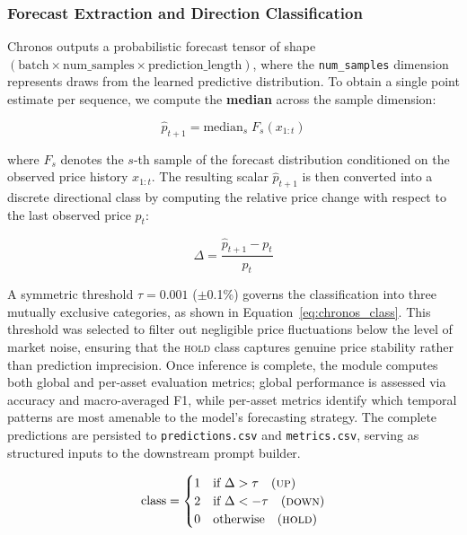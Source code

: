     \subsubsection{Forecast Extraction and Direction Classification}
    Chronos outputs a probabilistic forecast tensor of shape $(\text{batch} \times \text{num\_samples} \times \text{prediction\_length})$, where the \texttt{num\_samples} dimension represents draws from the learned predictive distribution. To obtain a single point estimate per sequence, we compute the \textbf{median} across the sample dimension:

    \begin{equation}
        \hat{p}_{t+1} = \mathrm{median}_{s} \; F_s(x_{1:t})
    \end{equation}

    where $F_s$ denotes the $s$-th sample of the forecast distribution conditioned on the observed price history $x_{1:t}$. The resulting scalar $\hat{p}_{t+1}$ is then converted into a discrete directional class by computing the relative price change with respect to the last observed price $p_t$:

    \begin{equation}
        \Delta = \frac{\hat{p}_{t+1} - p_t}{p_t}
    \end{equation}

    A symmetric threshold $\tau = 0.001$ ($\pm$0.1\%) governs the classification into three mutually exclusive categories, as shown in Equation~\ref{eq:chronos_class}. This threshold was selected to filter out negligible price fluctuations below the level of market noise, ensuring that the \textsc{hold} class captures genuine price stability rather than prediction imprecision. Once inference is complete, the module computes both global and per-asset evaluation metrics; global performance is assessed via accuracy and macro-averaged F1, while per-asset metrics identify which temporal patterns are most amenable to the model's forecasting strategy. The complete predictions are persisted to \texttt{predictions.csv} and \texttt{metrics.csv}, serving as structured inputs to the downstream prompt builder.

    \begin{equation}\label{eq:chronos_class}
        \text{class} =
        \begin{cases}
            1 & \text{if } \Delta > \tau \quad (\textsc{up}) \\
            2 & \text{if } \Delta < -\tau \quad (\textsc{down}) \\
            0 & \text{otherwise} \quad (\textsc{hold})
        \end{cases}
    \end{equation}

